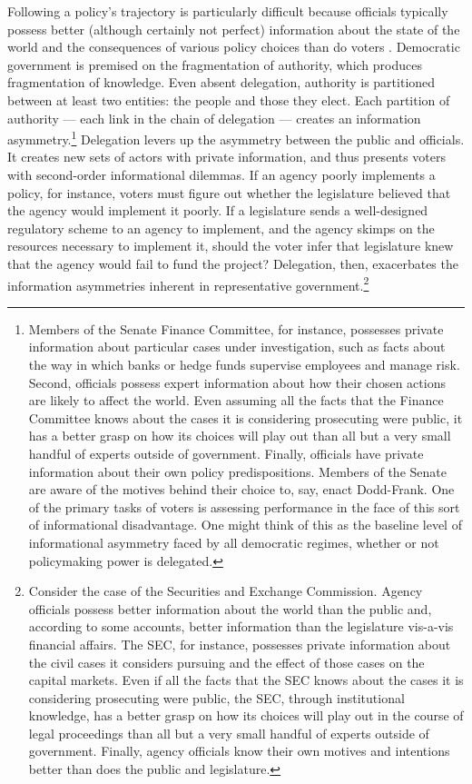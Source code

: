 \documentclass{article}
\begin{document}
Following a policy's trajectory is particularly difficult because officials typically possess better (although certainly not perfect) information about the state of the world and the consequences of various policy choices than do voters \citep{Shipan2002}. Democratic government is premised on the fragmentation of authority, which produces fragmentation of knowledge. Even absent delegation, authority is partitioned between at least two entities: the people and those they elect. Each partition of authority --- each link in the chain of delegation --- creates an information asymmetry.\footnote{Members of the Senate Finance Committee, for instance, possesses private information about particular cases under investigation, such as facts about the way in which banks or hedge funds supervise employees and manage risk. Second, officials possess expert information about how their chosen actions are likely to affect the world. Even assuming all the facts that the Finance Committee knows about the cases it is considering prosecuting were public, it has a better grasp on how its choices will play out than all but a very small handful of experts outside of government. Finally, officials have private information about their own policy predispositions. Members of the Senate are aware of the motives behind their choice to, say, enact Dodd-Frank. One of the primary tasks of voters is assessing performance in the face of this sort of informational disadvantage. One might think of this as the baseline level of informational asymmetry faced by all democratic regimes, whether or not policymaking power is delegated.} Delegation levers up the asymmetry between the public and officials. It creates new sets of actors with private information, and thus presents voters with second-order informational dilemmas. If an agency poorly implements a policy, for instance, voters must figure out whether the legislature believed that the agency would implement it poorly. If a legislature sends a well-designed regulatory scheme to an agency to implement, and the agency skimps on the resources necessary to implement it, should the voter infer that legislature knew that the agency would fail to fund the project? Delegation, then, exacerbates the information asymmetries inherent in representative government.\footnote{Consider the case of the Securities and Exchange Commission. Agency officials possess better information about the world than the public and, according to some accounts, better information than the legislature vis-a-vis financial affairs. The SEC, for instance, possesses private information about the civil cases it considers pursuing and the effect of those cases on the capital markets. Even if all the facts that the SEC knows about the cases it is considering prosecuting were public, the SEC, through institutional knowledge, has a better grasp on how its choices will play out in the course of legal proceedings than all but a very small handful of experts outside of government. Finally, agency officials know their own motives and intentions better than does the public and legislature.} 
\end{document}
